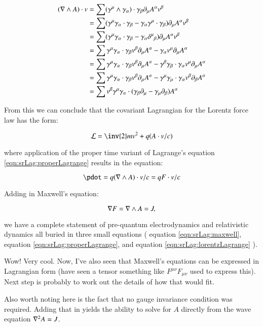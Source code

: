 \begin{align*}
(\nabla \wedge A) \cdot v
&= \sum ( \gamma^{\mu} \wedge \gamma_{\alpha} ) \cdot \gamma_{\beta} \partial_{\mu} A^{\alpha} v^{\beta} \\
&= \sum (\gamma^{\mu} \gamma_{\alpha} \cdot \gamma_{\beta} - \gamma_{\alpha} \gamma^{\mu} \cdot \gamma_{\beta}) \partial_{\mu} A^{\alpha} v^{\beta} \\
&= \sum (\gamma^{\mu} \gamma_{\alpha} \cdot \gamma_{\beta} - \gamma_{\alpha} {\delta^{\mu}}_{\beta}) \partial_{\mu} A^{\alpha} v^{\beta} \\
&= \sum 
 \gamma^{\mu} \gamma_{\alpha} \cdot \gamma_{\beta} v^{\beta} \partial_{\mu} A^{\alpha}
-\gamma_{\alpha} v^{\mu} \partial_{\mu} A^{\alpha} \\
&= \sum 
 \gamma^{\mu} \gamma_{\alpha} \cdot \gamma_{\beta} v^{\beta} \partial_{\mu} A^{\alpha}
-
\gamma^{\beta} \gamma_{\beta} \cdot \gamma_{\alpha}
 v^{\mu} \partial_{\mu} A^{\alpha} \\
&= \sum 
 \gamma^{\mu} \gamma_{\alpha} \cdot \gamma_{\beta} v^{\beta} \partial_{\mu} A^{\alpha}
-
\gamma^{\mu} \gamma_{\mu} \cdot \gamma_{\alpha} v^{\beta} \partial_{\beta} A^{\alpha} \\
&= \sum v^{\beta} \gamma^{\mu} \gamma_{\alpha} \cdot ( \gamma_{\beta} \partial_{\mu} - \gamma_{\mu} \partial_{\beta} ) A^{\alpha} \\ 
\end{align*}

From this we can conclude that the covariant Lagrangian for the Lorentz force law has the form:

\begin{equation}\label{eqn:srLag:lorentzLagrange}
\mathcal{L} = \inv{2}m v^2 + q (A \cdot v/c)
\end{equation}

where application of the proper time variant of Lagrange's equation \ref{eqn:srLag:properLagrange} results in the equation:

\begin{equation}
\pdot = q (\grad \wedge A) \cdot v/c = q F \cdot v/c
\end{equation}

Adding in Maxwell's equation:

\begin{equation}\label{eqn:srLag:maxwell}
\nabla F = \nabla \wedge A = J,
\end{equation}

we have a complete statement of pre-quantum electrodynamics and relativistic dynamics all buried in three small equations (
equation \ref{eqn:srLag:maxwell}, equation \ref{eqn:srLag:properLagrange}, and equation \ref{eqn:srLag:lorentzLagrange} ).

Wow!  Very cool.  Now, I've also seen that Maxwell's equations can be expressed in Lagrangian form (have seen a tensor something like $F^{\mu\nu} F_{\mu\nu}$ used to express this).  Next step is probably to work out the details of how that would fit.

Also worth noting here is the fact that no gauge invariance condition was required.  Adding that in yields the ability to solve for $A$ directly from the wave equation $\nabla^2 A = J$.
